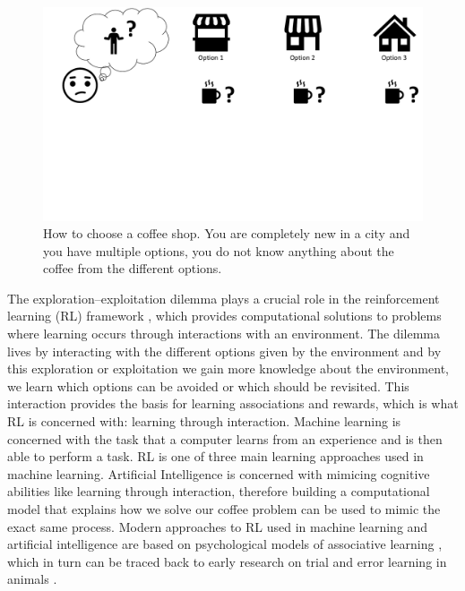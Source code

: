 \begin{figure}
    \centering
    \includegraphics[width=1\textwidth]{Plots/CoffeExample.pdf}
    \vspace{-4cm}
    \caption[Coffee Shop Example]{How to choose a coffee shop. You are completely new in a city and you have multiple options, you do not know anything about the coffee from the different options.}
    \label{fig:Coffe_Example}
\end{figure}


The exploration--exploitation dilemma plays a crucial role in the reinforcement learning (RL) framework \citep{sutton2018reinforcement}, which provides computational solutions to problems where learning occurs through interactions with an environment.
The dilemma lives by interacting with the different options given by the environment and by this exploration or exploitation we gain more knowledge about the environment, we learn which options can be avoided or which should be revisited. This interaction provides the basis for learning associations and rewards, which is what RL is concerned with: learning through interaction. 
Machine learning is concerned with the task that a computer learns from an experience and is then able to perform a task. RL is one of three main learning approaches used in machine learning. 
Artificial Intelligence is concerned with mimicing cognitive abilities like learning through interaction, therefore building a computational model that explains how we solve our coffee problem can be used to mimic the exact same process. 
Modern approaches to RL used in machine learning \citep{sutton2018reinforcement} and artificial intelligence \citep{sutton2018reinforcement, russell2016artificial} are based on psychological models of associative learning \citep{bush1951model,rescorla1972theory,dayan2000learning,sutton2018reinforcement}, which in turn can be traced back to early research on trial and error learning in animals \citep{thorndike1927law, skinner1963operant}.

